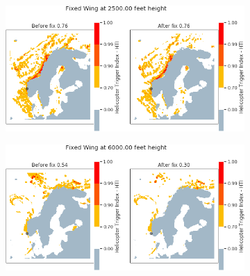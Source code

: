\begin{figure}[H]
    \begin{subfigure}{0.45\textwidth}
    \centering
    \includegraphics[width=\textwidth]{Figures/10.png}
    \caption{}
    \label{fig:HTI10}
    \end{subfigure}
\hfill
    \begin{subfigure}{0.45\textwidth}
    \centering
    \includegraphics[width=\textwidth]{Figures/13.png}
    \caption{}
    \label{fig:HTI13}
    \end{subfigure}


\end{figure}

